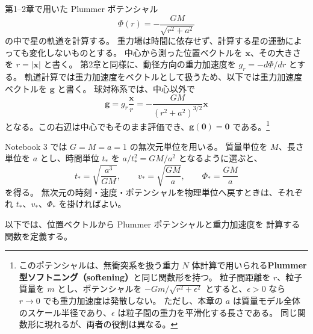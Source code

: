 第1--2章で用いた Plummer ポテンシャル
\begin{equation}
 \Phi(r)=-\frac{GM}{\sqrt{r^2+a^2}}
\label{eq:ch3-plummer-potential}
\end{equation}
の中で星の軌道を計算する。
重力場は時間に依存せず、計算する星の運動によっても変化しないものとする。
中心から測った位置ベクトルを $\boldsymbol{x}$、その大きさを $r=|\boldsymbol{x}|$ と書く。
第2章と同様に、動径方向の重力加速度を $g_r=-d\Phi/dr$ とする。
軌道計算では重力加速度をベクトルとして扱うため、以下では重力加速度ベクトルを $\boldsymbol{g}$ と書く。
球対称系では、中心以外で
\begin{equation}
 \boxed{\boldsymbol{g}=g_r\frac{\boldsymbol{x}}{r}=-\frac{GM}{(r^2+a^2)^{3/2}}\boldsymbol{x}}
\label{eq:ch3-plummer-acc}
\end{equation}
となる。この右辺は中心でもそのまま評価でき、$\boldsymbol{g}(\boldsymbol{0})=\boldsymbol{0}$ である。\footnote{
このポテンシャルは、無衝突系を扱う重力 $N$ 体計算で用いられる\textbf{Plummer 型ソフトニング（softening）}と同じ関数形を持つ\cite{matsumoto}。
粒子間距離を $r$、粒子質量を $m$ とし、ポテンシャルを $-Gm/\sqrt{r^2+\epsilon^2}$ とすると、$\epsilon>0$ なら $r\to0$ でも重力加速度は発散しない。
ただし、本章の $a$ は質量モデル全体のスケール半径であり、$\epsilon$ は粒子間の重力を平滑化する長さである。
同じ関数形に現れるが、両者の役割は異なる。
}

Notebook 3 では $G=M=a=1$ の無次元単位を用いる。
質量単位を $M$、長さ単位を $a$ とし、時間単位 $t_\ast$ を $a/t_\ast^2=GM/a^2$ となるように選ぶと、
\begin{equation}
 t_\ast=\sqrt{\frac{a^3}{GM}},\qquad
 v_\ast=\sqrt{\frac{GM}{a}},\qquad
 \Phi_\ast=\frac{GM}{a}
\label{eq:ch3-dynamical-units}
\end{equation}
を得る。
無次元の時刻・速度・ポテンシャルを物理単位へ戻すときは、それぞれ $t_\ast$、$v_\ast$、$\Phi_\ast$ を掛ければよい。

以下では、位置ベクトルから Plummer ポテンシャルと重力加速度を
計算する関数を定義する。

